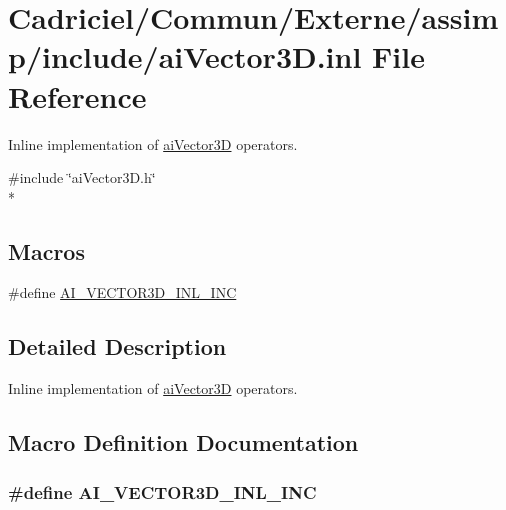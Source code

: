 \hypertarget{ai_vector3_d_8inl}{\section{Cadriciel/\-Commun/\-Externe/assimp/include/ai\-Vector3\-D.inl File Reference}
\label{ai_vector3_d_8inl}
}


Inline implementation of \hyperlink{structai_vector3_d}{ai\-Vector3\-D} operators.  


{\ttfamily \#include \char`\"{}ai\-Vector3\-D.\-h\char`\"{}}\\*
\subsection*{Macros}
\begin{DoxyCompactItemize}
\item 
\#define \hyperlink{ai_vector3_d_8inl_a7409280d1fdec1b54ab4566ef44ac17b}{A\-I\-\_\-\-V\-E\-C\-T\-O\-R3\-D\-\_\-\-I\-N\-L\-\_\-\-I\-N\-C}
\end{DoxyCompactItemize}


\subsection{Detailed Description}
Inline implementation of \hyperlink{structai_vector3_d}{ai\-Vector3\-D} operators. 

\subsection{Macro Definition Documentation}
\hypertarget{ai_vector3_d_8inl_a7409280d1fdec1b54ab4566ef44ac17b}{
\subsubsection[{A\-I\-\_\-\-V\-E\-C\-T\-O\-R3\-D\-\_\-\-I\-N\-L\-\_\-\-I\-N\-C}]{\setlength{\rightskip}{0pt plus 5cm}\#define A\-I\-\_\-\-V\-E\-C\-T\-O\-R3\-D\-\_\-\-I\-N\-L\-\_\-\-I\-N\-C}}\label{ai_vector3_d_8inl_a7409280d1fdec1b54ab4566ef44ac17b}
